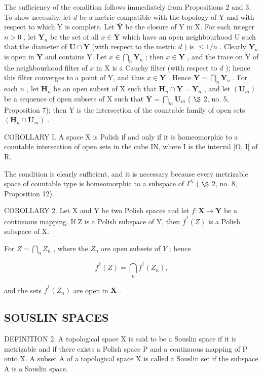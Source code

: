 The sufficiency of the condition follows immediately from Propositions 2 and 3. To show necessity, let \(d\) be a metric compatible with the topology of Y and with respect to which Y is complete. Let \(\overline{\mathbf{Y}}\) be the closure of Y in X. For each integer \(n>0\) , let \(\mathbf{Y}_{n}\) be the set of all \(x\in\overline{\mathbf{Y}}\) which have an open neighbourhood U such that the diameter of \(\mathbf{U}\cap\mathbf{Y}\) (with respect to the metric \(d\) ) is \(\leqslant1/n\) . Clearly \(\mathbf{Y}_{n}\) is open in \(\overline{\mathbf{Y}}\) and contains Y. Let \(x\in\bigcap_{n}\mathbf{Y}_{n}\) ; then \(x\in\overline{\mathbf{Y}}\) , and the trace on Y of the neighbourhood filter of \(x\) in X is a Cauchy filter (with respect to \(d\) ); hence this filter converges to a point of Y, and thus \(x\in\mathbf{Y}\) . Hence \(\mathbf{Y}=\bigcap_{n}\mathbf{Y}_{n}\) . For each \(n\) , let \(\mathbf{H}_{n}\) be an open subset of X such that \(\mathbf{H}_{n}\cap\overline{\mathbf{Y}}=\mathbf{Y}_{n}\) , and let \((\mathbf{U}_{m})\) be a sequence of open subsets of X such that \(\overline{\mathbf{Y}}=\bigcap_{m}\mathbf{U}_{m}\) ( \(\S\) 2, no. 5, Proposition 7); then Y is the intersection of the countable family of open sets \((\mathbf{H}_{n}\cap\mathbf{U}_{m})\) .

COROLLARY I. A space X is Polish if and only if it is homeomorphic to a countable intersection of open sets in the cube IN, where I is the interval {[}O, I{]} of R.

The condition is clearly sufficient, and it is necessary because every metrizable space of countable type is homeomorphic to a subspace of \(I^{N}\) ( \(\S\) 2, no. 8, Proposition 12).

COROLLARY 2. Let X and Y be two Polish spaces and let \(f: \mathbf{X} \to \mathbf{Y}\) be a continuous mapping. If Z is a Polish subspace of Y, then \(\overline{f}^{1}(Z)\) is a Polish subspace of X.

For \(Z = \bigcap_{n} Z_n\) , where the \(Z_n\) are open subsets of \(Y\) ; hence

\[
\overline {{{f}}} ^ {1} (Z) = \bigcap_ {n} \overline {{{f}}} ^ {1} (Z _ {n}),
\]

and the sets \(\overline{f}^1 (Z_n)\) are open in \(\mathbf{X}\) .

\subsection{SOUSLIN SPACES}

DEFINITION 2. A topological space X is said to be a Souslin space if it is metrizable and if there exists a Polish space P and a continuous mapping of P onto X. A subset A of a topological space X is called a Souslin set if the subspace A is a Souslin space.

